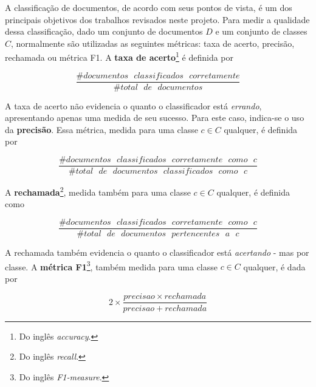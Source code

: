 A classificação de documentos, de acordo com seus pontos de vista, é um dos principais objetivos dos trabalhos revisados neste projeto. Para medir a qualidade dessa classificação, dado um conjunto de documentos \ensuremath{D} e um conjunto de classes \ensuremath{C}, normalmente são utilizadas as seguintes métricas: taxa de acerto, precisão, rechamada ou métrica F1. A \textbf{taxa de acerto}\footnote{Do inglês \emph{accuracy}.} é definida por \cite{manning}

\begin{equation}
\label{accuracy}
\ensuremath{\frac{\#documentos\mbox{ }classificados\mbox{ }corretamente}{\#total\mbox{ }de\mbox{ }documentos}}
\end{equation}

A taxa de acerto não evidencia o quanto o classificador está \emph{errando}, apresentando apenas uma medida de seu sucesso. Para este caso, indica-se o uso da \textbf{precisão}. Essa métrica, medida para uma classe \ensuremath{c \in C} qualquer, é definida por \cite{manning}

\begin{equation}
\label{precision}
\ensuremath{\frac{\#documentos\mbox{ }classificados\mbox{ }corretamente\mbox{ }como\mbox{ }c}{\#total\mbox{ }de\mbox{ }documentos\mbox{ }classificados\mbox{ }como\mbox{ }c}}
\end{equation}

A \textbf{rechamada}\footnote{Do inglês \emph{recall}.}, medida também para uma classe \ensuremath{c \in C} qualquer, é definida como \cite{manning}

\begin{equation}
\label{recall}
\ensuremath{\frac{\#documentos\mbox{ }classificados\mbox{ }corretamente\mbox{ }como\mbox{ }c}{\#total\mbox{ }de\mbox{ }documentos\mbox{ }pertencentes\mbox{ }a\mbox{ }c}}
\end{equation}

A rechamada também evidencia o quanto o classificador está \emph{acertando} - mas por classe. A \textbf{métrica F1}\footnote{Do inglês \emph{F1-measure}.}, também medida para uma classe \ensuremath{c \in C} qualquer, é dada por \cite{manning}

\begin{equation}
\label{f1measure}
\ensuremath{2 \times \frac{precisao \times rechamada}{precisao + rechamada}}
\end{equation} 


